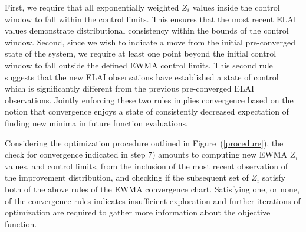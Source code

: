 \documentclass{article}
\begin{document}
%
First, we require that all exponentially weighted $Z_i$ values inside the 
control window to fall within the control limits. This ensures that the most 
recent ELAI values demonstrate distributional consistency within the bounds of 
the control window. Second, since we wish to indicate a move from the initial 
pre-converged state of the system, we require at least one point beyond the 
initial control window to fall outside the defined EWMA control limits. This 
second rule suggests that the new ELAI observations have established a state 
of control which is significantly different from the previous pre-converged 
ELAI observations. Jointly enforcing these two rules implies convergence based 
on the notion that convergence enjoys a state of consistently decreased 
expectation of finding new minima in future function evaluations.

%
%

%
Considering the optimization procedure outlined in Figure~(\ref{procedure}), 
the check for convergence indicated in step 7) amounts to computing new EWMA 
$Z_i$ values, and control limits, from the inclusion of the most recent 
observation of the improvement distribution, and checking if the subsequent 
set of $Z_i$ satisfy both of the above rules of the EWMA convergence 
chart. Satisfying one, or none, of the convergence rules indicates insufficient 
exploration and further iterations of optimization are required to gather more 
information about the objective function.    


%
%
%
\end{document}
